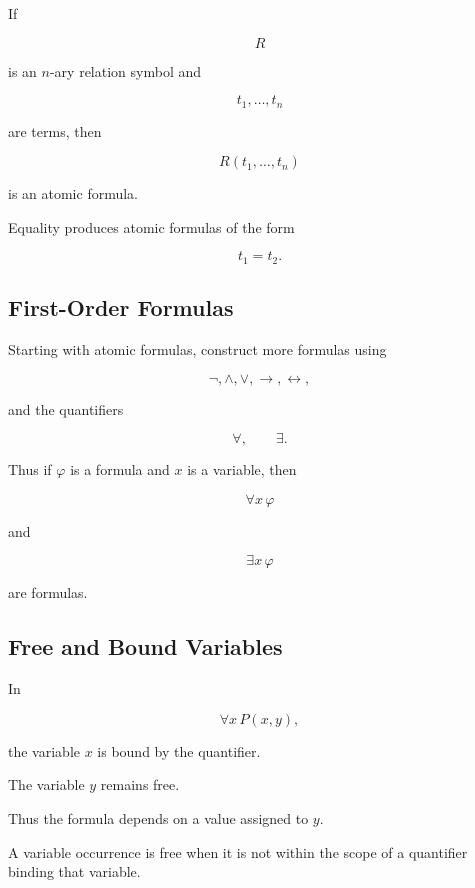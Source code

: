 If

\[
R
\]

is an \(n\)-ary relation symbol and

\[
t_1,\ldots,t_n
\]

are terms, then

\[
\boxed{
R(t_1,\ldots,t_n)
}
\]

is an atomic formula.

Equality produces atomic formulas of the form

\[
\boxed{
t_1=t_2.
}
\]

\subsection{First-Order Formulas}
\label{subsec:first-order-formulas}

Starting with atomic formulas, construct more formulas using

\[
\boxed{
\neg,
\land,
\lor,
\rightarrow,
\leftrightarrow,
}
\]

and the quantifiers

\[
\boxed{
\forall,
\qquad
\exists.
}
\]

Thus if \(\varphi\) is a formula and \(x\) is a variable, then

\[
\boxed{
\forall x\,\varphi
}
\]

and

\[
\boxed{
\exists x\,\varphi
}
\]

are formulas.

\subsection{Free and Bound Variables}
\label{subsec:free-bound-variables}

In

\[
\forall x\,P(x,y),
\]

the variable \(x\) is bound by the quantifier.

The variable \(y\) remains free.

Thus the formula depends on a value assigned to \(y\).

A variable occurrence is free when it is not within the scope of a
quantifier binding that variable.

